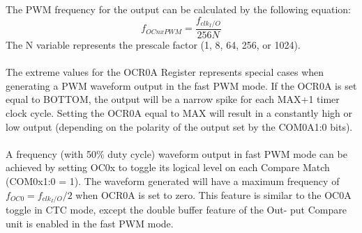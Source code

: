 \documentclass[english]{article}
\begin{document}
The PWM frequency for the output can be calculated by the following equation:
$$
f_{OCnxPWM}=\frac{f_{clk_I/O}}{256N}
$$
The N variable represents the prescale factor (1, 8, 64, 256, or 1024).\\\\
The extreme values for the OCR0A Register represents special cases when generating a PWM waveform output in the fast PWM mode. If the OCR0A is set equal to BOTTOM, the output will be a narrow spike for each MAX+1 timer clock cycle. Setting the OCR0A equal to MAX will result in a constantly high or low output (depending on the polarity of the output set by the COM0A1:0 bits).\\\\
A frequency (with 50\% duty cycle) waveform output in fast PWM mode can be achieved by setting OC0x to toggle its logical level on each Compare Match (COM0x1:0 = 1). The waveform
generated will have a maximum frequency of $f_{OC0}=f_{clk_I/O}/2$ when OCR0A is set to zero. This
feature is similar to the OC0A toggle in CTC mode, except the double buffer feature of the Out-
put Compare unit is enabled in the fast PWM mode.
\end{document}
